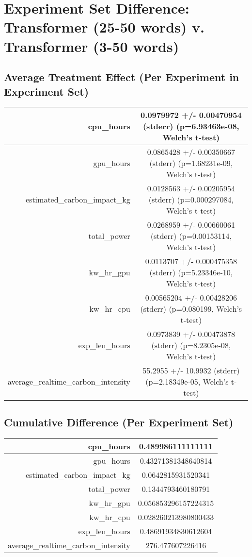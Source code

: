\documentclass{article}%
\begin{document}
%
\normalsize%
\section{Experiment Set Difference: Transformer (25{-}50 words) v. Transformer (3{-}50 words)}%
\label{sec:Experiment Set Difference Transformer (25{-}50 words) v. Transformer (3{-}50 words)}%
\subsection{Average Treatment Effect (Per Experiment in Experiment Set)}%
\label{subsec:Average Treatment Effect (Per Experiment in Experiment Set)}%
\begin{tabular}{|r|c|}%
\hline%
cpu\_hours&0.0979972 +/{-} 0.00470954 (stderr) (p=6.93463e{-}08, Welch's t{-}test)\\%
\hline%
gpu\_hours&0.0865428 +/{-} 0.00350667 (stderr) (p=1.68231e{-}09, Welch's t{-}test)\\%
\hline%
estimated\_carbon\_impact\_kg&0.0128563 +/{-} 0.00205954 (stderr) (p=0.000297084, Welch's t{-}test)\\%
\hline%
total\_power&0.0268959 +/{-} 0.00660061 (stderr) (p=0.00153114, Welch's t{-}test)\\%
\hline%
kw\_hr\_gpu&0.0113707 +/{-} 0.000475358 (stderr) (p=5.23346e{-}10, Welch's t{-}test)\\%
\hline%
kw\_hr\_cpu&0.00565204 +/{-} 0.00428206 (stderr) (p=0.080199, Welch's t{-}test)\\%
\hline%
exp\_len\_hours&0.0973839 +/{-} 0.00473878 (stderr) (p=8.2305e{-}08, Welch's t{-}test)\\%
\hline%
average\_realtime\_carbon\_intensity&55.2955 +/{-} 10.9932 (stderr) (p=2.18349e{-}05, Welch's t{-}test)\\%
\hline%
\end{tabular}

%
\subsection{Cumulative Difference (Per Experiment Set)}%
\label{subsec:Cumulative Difference (Per Experiment Set)}%
\begin{tabular}{|r|c|}%
\hline%
cpu\_hours&0.489986111111111\\%
\hline%
gpu\_hours&0.43271381348640814\\%
\hline%
estimated\_carbon\_impact\_kg&0.0642815931520341\\%
\hline%
total\_power&0.1344793460180791\\%
\hline%
kw\_hr\_gpu&0.056853296157224315\\%
\hline%
kw\_hr\_cpu&0.028260213980800433\\%
\hline%
exp\_len\_hours&0.48691934830612604\\%
\hline%
average\_realtime\_carbon\_intensity&276.477607226416\\%
\hline%
\end{tabular}

%
\end{document}
